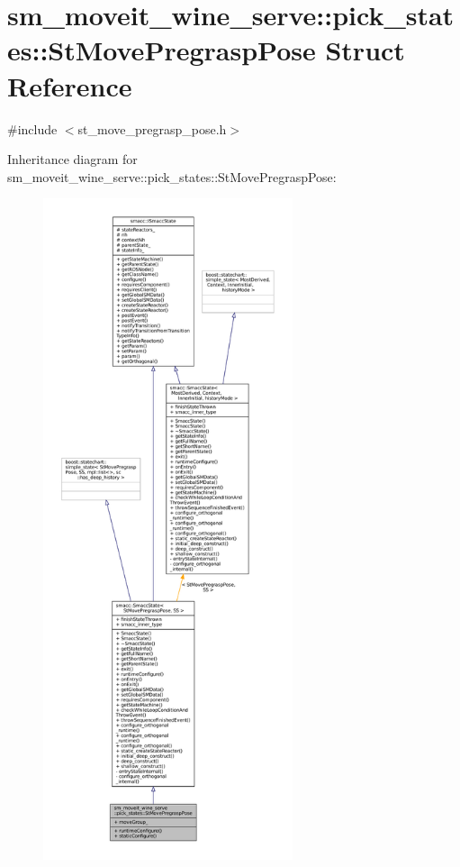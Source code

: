 \hypertarget{structsm__moveit__wine__serve_1_1pick__states_1_1StMovePregraspPose}{}\section{sm\+\_\+moveit\+\_\+wine\+\_\+serve\+:\+:pick\+\_\+states\+:\+:St\+Move\+Pregrasp\+Pose Struct Reference}
\label{structsm__moveit__wine__serve_1_1pick__states_1_1StMovePregraspPose}


{\ttfamily \#include $<$st\+\_\+move\+\_\+pregrasp\+\_\+pose.\+h$>$}



Inheritance diagram for sm\+\_\+moveit\+\_\+wine\+\_\+serve\+:\+:pick\+\_\+states\+:\+:St\+Move\+Pregrasp\+Pose\+:
\nopagebreak
\begin{figure}[H]
\begin{center}
\leavevmode
\includegraphics[height=550pt]{structsm__moveit__wine__serve_1_1pick__states_1_1StMovePregraspPose__inherit__graph}
\end{center}
\end{figure}


